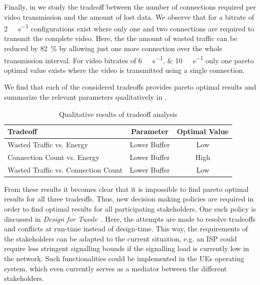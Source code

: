 Finally, in  we study the tradeoff between the number of connections required per video transmission and the amount of lost data.
We observe that for a bitrate of \SI{2}{\mega\bit\per\second} configurations exist where only one and two connections are required to transmit the complete video.
Here, the the amount of wasted traffic can be reduced by \SI{82}{\percent} by allowing just one more connection over the whole transmission interval.
For video bitrates of \SIlist{6;10}{\mega\bit\per\second} only one pareto optimal value exists where the video is transmitted using a single connection.

We find that each of the considered tradeoffs provides pareto optimal results and summarize the relevant parameters qualitatively in .
\begin{table}
  \centering
  \begin{tabular}{lcc}
    \toprule
    Tradeoff & Parameter & Optimal Value\\
    \midrule
    Wasted Traffic vs. Energy & Lower Buffer & Low\\
    Connection Count vs. Energy & Lower Buffer & High\\
    Wasted Traffic vs. Connection Count & Lower Buffer & Low\\
    \bottomrule
  \end{tabular}
  \caption{Qualitative results of tradeoff analysis}
  \label{tab:application:lte_video:numerical_evaluation:trade_offs:summary}
\end{table}

From these results it becomes clear that it is impossible to find pareto optimal results for all three tradeoffs.
Thus, new decision making policies are required in order to find optimal results for all participating stakeholders.
One such policy is discussed in \emph{Design for Tussle}~\cite{trilogy2008,Clark2005}.
Here, the attempts are made to resolve tradeoffs and conflicts at run-time instead of design-time.
This way, the requirements of the stakeholders can be adapted to the current situation, e.g. an \gls{ISP} could require less stringent signalling bounds if the signalling load is currently low in the network.
Such functionalities could be implemented in the \glspl{UE} operating system, which even currently serves as a mediator between the different stakeholders.